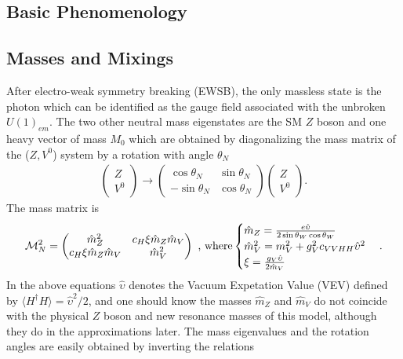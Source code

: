 \subsection{Basic Phenomenology}
\subsection*{Masses and Mixings}
After electro-weak symmetry breaking (EWSB), the only massless state is the photon which can be identified as the gauge field associated with the unbroken $U(1)_{em}$. The two other neutral mass eigenstates are the SM $Z$ boson and one heavy vector of mass $M_{0}$ which are obtained by diagonalizing the mass matrix of the ($Z,V^{0}$) system by a rotation with angle $\theta_{N}$
\begin{align}
  \begin{pmatrix}
    Z\\
    V^{0}
  \end{pmatrix}
  \rightarrow
  \begin{pmatrix}
    \cos{\theta_{N}} & \sin{\theta_{N}}\\
    -\sin{\theta_{N}}& \cos{\theta_{N}}
  \end{pmatrix}
  \begin{pmatrix}
    Z\\
    V^{0}
  \end{pmatrix}
  .
\end{align}
The mass matrix is
\begin{align}
  \label{eq:MassMatrixN}
  \mathcal{M}_{N}^{2}=
  \begin{pmatrix}
    \hat{m}_{Z}^{2} & c_{H}\xi \hat{m}_{Z} \hat{m}_{V}\\
    c_{H}\xi \hat{m}_{Z} \hat{m}_{V} & \hat{m}_{V}^{2}
  \end{pmatrix}
  \textup{ , where}
  \begin{cases}
    \hat{m}_{Z}=\frac{e\hat{\upsilon}}{2\sin{\theta_{W}}\cos{\theta_{W}}}\\
    \hat{m}_{V}^{2}=m_{V}^{2}+g_{V}^{2}c_{VVHH}\hat{\upsilon}^{2}\\
    \xi=\frac{g_{V}\hat{\upsilon}}{2\hat{m}_{V}}
  \end{cases}
  .
\end{align}
In the above equations $\hat{\upsilon}$ denotes the Vacuum Expetation Value (VEV) defined by $\big \langle H^{\dagger}H\big \rangle=\hat{\upsilon}^{2}/2$, and one should know the masses $\hat{m}_{Z}$ and $\hat{m}_{V}$ do not coincide with the physical $Z$ boson and new resonance masses of this model, although they do in the approximations later. The mass eigenvalues and the rotation angles are easily obtained by inverting the relations
